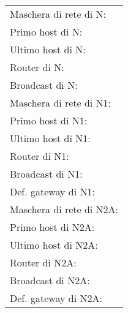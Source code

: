 \documentclass[a4paper, 12pt]{article}
\newcommand{\blankline}[1]{\uline{\hspace{#1}}}
\begin{document}
\begin{enumerate}

\vspace{1cm}
    
    \begin{tabularx}{\textwidth}{@{}l@{\blankline{6cm}}}
        Maschera di rete di N: \\
        Primo host di N: \\
        Ultimo host di N: \\
        Router di N: \\
        Broadcast di N: \\
        \hline
        Maschera di rete di N1: \\
        Primo host di N1: \\
        Ultimo host di N1: \\
        Router di N1: \\
        Broadcast di N1: \\
        Def. gateway di N1: \\
        \hline
        Maschera di rete di N2A: \\
        Primo host di N2A: \\
        Ultimo host di N2A: \\
        Router di N2A: \\
        Broadcast di N2A: \\
        Def. gateway di N2A: \\
    \end{tabularx}
\end{enumerate}
\end{document}
